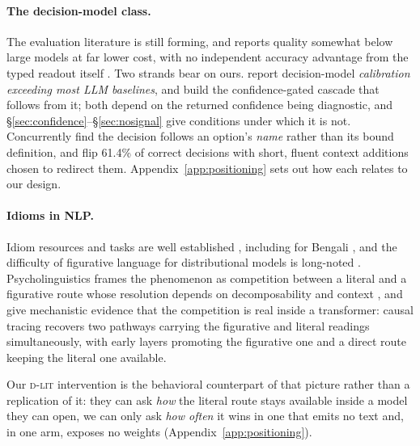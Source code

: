 \documentclass[11pt]{article}
\newcommand{\Dlit}{\textsc{d-lit}}
\begin{document}
\paragraph{The decision-model class.} The evaluation literature is still
forming, and reports quality somewhat below large models at far lower cost, with no independent
accuracy advantage from the typed readout itself
\citep{tang2026audit,rao2026rubric,ibrahim2026evaluating,guo2026justask,yu2026visualjev}.
Two strands bear on ours. \citet{ibrahim2026evaluating} report decision-model
\emph{calibration exceeding most LLM baselines}, and \citet{li2026jevjudge}
build the confidence-gated cascade that follows from it; both depend on the
returned confidence being diagnostic, and
\S\ref{sec:confidence}--\S\ref{sec:nosignal} give conditions under which it
is not. Concurrently \citet{sun2026typesafe} find the decision follows an
option's \emph{name} rather than its bound definition, and
\citet{xu2026jevout} flip 61.4\% of correct decisions with short, fluent context
additions chosen to redirect them.
Appendix~\ref{app:positioning} sets out how each relates to our design.

\paragraph{Idioms in NLP.} Idiom resources and tasks are well established
\citep{haagsma2020magpie,tayyarmadabushi2022semeval,chakrabarty2022flute},
including for Bengali \citep{sakhawat-etal-2026-words}, and the difficulty of
figurative language for distributional models is long-noted
\citep{shwartz2019pain}. Psycholinguistics frames the phenomenon as competition
between a literal and a figurative route whose resolution depends on
decomposability and context
\citep{cacciari1988comprehension,gibbs1989kick,titone1999compositional}, and
\citet{oh2026tug} give mechanistic evidence that the competition is real inside
a transformer: causal tracing recovers two pathways carrying the figurative and
literal readings simultaneously, with early layers promoting the figurative one
and a direct route keeping the literal one available.

Our \Dlit{} intervention is the behavioral counterpart of that picture rather
than a replication of it: they can ask \emph{how} the literal route stays
available inside a model they can open, we can only ask \emph{how often} it
wins in one that emits no text and, in one arm, exposes no weights
(Appendix~\ref{app:positioning}).
\end{document}

